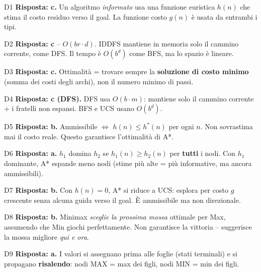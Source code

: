 \documentclass[12pt,a4paper]{article}
\begin{document}
\begin{risposta}{D1}
\textbf{Risposta: c.} Un algoritmo \emph{informato} usa una funzione euristica $h(n)$ che stima il costo residuo verso il goal. La funzione costo $g(n)$ è usata da entrambi i tipi.
\end{risposta}

\begin{risposta}{D2}
\textbf{Risposta: c} -- $O(br \cdot d)$. IDDFS mantiene in memoria solo il cammino corrente, come DFS. Il tempo è $O(b^d)$ come BFS, ma lo spazio è lineare.
\end{risposta}

\begin{risposta}{D3}
\textbf{Risposta: c.} Ottimalità = trovare sempre la \textbf{soluzione di costo minimo} (somma dei costi degli archi), non il numero minimo di passi.
\end{risposta}

\begin{risposta}{D4}
\textbf{Risposta: c (DFS).} DFS usa $O(b \cdot m)$: mantiene solo il cammino corrente + i fratelli non espansi. BFS e UCS usano $O(b^d)$.
\end{risposta}

\begin{risposta}{D5}
\textbf{Risposta: b.} Ammissibile $\Leftrightarrow$ $h(n) \leq h^*(n)$ per ogni $n$. Non sovrastima mai il costo reale. Questo garantisce l'ottimalità di A*.
\end{risposta}

\begin{risposta}{D6}
\textbf{Risposta: a.} $h_1$ domina $h_2$ se $h_1(n) \geq h_2(n)$ per \textbf{tutti} i nodi. Con $h_1$ dominante, A* espande meno nodi (stime più alte = più informative, ma ancora ammissibili).
\end{risposta}

\begin{risposta}{D7}
\textbf{Risposta: b.} Con $h(n) = 0$, A* si riduce a UCS: esplora per costo $g$ crescente senza alcuna guida verso il goal. È ammissibile ma non direzionale.
\end{risposta}

\begin{risposta}{D8}
\textbf{Risposta: b.} Minimax \emph{sceglie la prossima mossa} ottimale per Max, assumendo che Min giochi perfettamente. Non garantisce la vittoria -- suggerisce la mossa migliore \emph{qui e ora}.
\end{risposta}

\begin{risposta}{D9}
\textbf{Risposta: a.} I valori si assegnano prima alle foglie (stati terminali) e si propagano \textbf{risalendo}: nodi MAX = max dei figli, nodi MIN = min dei figli.
\end{risposta}
\end{document}
